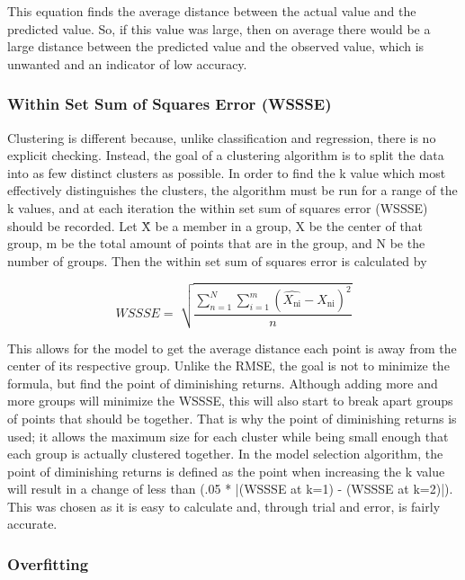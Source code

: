 \documentclass[9pt,twocolumn,twoside]{idsi}
\begin{document}
This equation finds the average distance between the actual value and the predicted value\cite{rms_error}. So, if this value was large, then on average there would be a large distance between the predicted value and the observed value, which is unwanted and an indicator of low accuracy.



\subsubsection{Within Set Sum of Squares Error (WSSSE)} \label{wssse}
Clustering is different because, unlike classification and regression, there is no explicit checking. Instead, the goal of a clustering algorithm is to split the data into as few distinct clusters as possible. In order to find the k value which most effectively distinguishes the clusters, the algorithm must be run for a range of the k values, and at each iteration the within set sum of squares error (WSSSE) should be recorded. Let \^{X} be a member in a group, X be the center of that group, m be the total amount of points that are in the group, and N be the number of groups. Then the within set sum of squares error is calculated by

\begin{equation}
WSSSE =\sqrt[]{\frac{\sum_{n=1}^{N}\sum_{i=1}^{m} (\hat{X_{\text{ni}}} - X_{\text{ni}})^2}{n}}
\label{eq:wssse}
\end{equation}

This allows for the model to get the average distance each point is away from the center of its respective group. Unlike the RMSE, the goal is not to minimize the formula, but find the point of diminishing returns. Although adding more and more groups will minimize the WSSSE, this will also start to break apart groups of points that should be together. That is why the point of diminishing returns is used; it allows the maximum size for each cluster while being small enough that each group is actually clustered together. In the model selection algorithm, the point of diminishing returns is defined as the point when increasing the k value will result in a change of less than (.05 * |(WSSSE at k=1) - (WSSSE at k=2)|). This was chosen as it is easy to calculate and, through trial and error, is fairly accurate.

\subsubsection{Overfitting} \label{overfitting}
\end{document}
